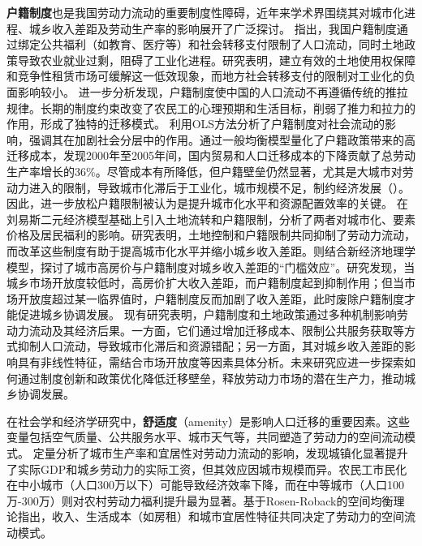 \documentclass[a4paper, zihao=-4, fontset = mac, oneside]{ctexbook} %
\begin{document}
\textbf{户籍制度}也是我国劳动力流动的重要制度性障碍，近年来学术界围绕其对城市化进程、城乡收入差距及劳动生产率的影响展开了广泛探讨。
\textcite{ngaiChinasMobilityBarriers2019}指出，我国户籍制度通过绑定公共福利（如教育、医疗等）和社会转移支付限制了人口流动，同时土地政策导致农业就业过剩，阻碍了工业化进程。研究表明，建立有效的土地使用权保障和竞争性租赁市场可缓解这一低效现象，而地方社会转移支付的限制对工业化的负面影响较小。
\textcite{LiQiangYingXiangZhongGuoChengXiangLiuDongRenKouDeTuiLiYuLaLiYinSuFenXi2003}进一步分析发现，户籍制度使中国的人口流动不再遵循传统的推拉规律。长期的制度约束改变了农民工的心理预期和生活目标，削弱了推力和拉力的作用，形成了独特的迁移模式。
\textcite{LuYiLongHuKouHuanQiZuoYongMaHuJiZhiDuYuSheHuiFenCengHeLiuDong2008}利用OLS方法分析了户籍制度对社会流动的影响，强调其在加剧社会分层中的作用。\textcite{tombeTradeMigrationProductivity2019}通过一般均衡模型量化了户籍政策带来的高迁移成本，发现2000年至2005年间，国内贸易和人口迁移成本的下降贡献了总劳动生产率增长的36\%。尽管成本有所降低，但户籍壁垒仍然显著，尤其是大城市对劳动力进入的限制，导致城市化滞后于工业化，城市规模不足，制约经济发展（\textcite{WangLiLiWoGuoRenKouQianYiChengBenChengShiGuiMoYuShengChanLu2020}）。因此，进一步放松户籍限制被认为是提升城市化水平和资源配置效率的关键。
\textcite{ZhouWenTuDiLiuZhuanHuJiZhiDuGaiGeYuZhongGuoChengShiHuaLiLunYuMoNi2017}在刘易斯二元经济模型基础上引入土地流转和户籍限制，分析了两者对城市化、要素价格及居民福利的影响。研究表明，土地控制和户籍限制共同抑制了劳动力流动，而改革这些制度有助于提高城市化水平并缩小城乡收入差距。\textcite{AnHuSenChengShiGaoFangJieHeHuJiZhiDuCuJinHuoYiZhiChengXiangShouRuChaiJuKuoDaZhongGuoLaoDongLiLiuDongHeShouRuChaiJuKuoDaBeiLunDeYiGeJieShi2011}则结合新经济地理学模型，探讨了城市高房价与户籍制度对城乡收入差距的“门槛效应”。研究发现，当城乡市场开放度较低时，高房价扩大收入差距，而户籍制度起到抑制作用；但当市场开放度超过某一临界值时，户籍制度反而加剧了收入差距，此时废除户籍制度才能促进城乡协调发展。
现有研究表明，户籍制度和土地政策通过多种机制影响劳动力流动及其经济后果。一方面，它们通过增加迁移成本、限制公共服务获取等方式抑制人口流动，导致城市化滞后和资源错配；另一方面，其对城乡收入差距的影响具有非线性特征，需结合市场开放度等因素具体分析。未来研究应进一步探索如何通过制度创新和政策优化降低迁移壁垒，释放劳动力市场的潜在生产力，推动城乡协调发展。


在社会学和经济学研究中，\textbf{舒适度}（amenity）是影响人口迁移的重要因素。这些变量包括空气质量、公共服务水平、城市天气等，共同塑造了劳动力的空间流动模式。
\textcite{YangXiChengShiGuiMoYuChengZhenHuaNongMinGongShiMinHuaDeJingJiXiaoYingJiYuChengShiShengChanLuYuYiJuDuChaiYiDeDingLiangFenXi2017}定量分析了城市生产率和宜居性对劳动力流动的影响，发现城镇化显著提升了实际GDP和城乡劳动力的实际工资，但其效应因城市规模而异。农民工市民化在中小城市（人口300万以下）可能导致经济效率下降，而在中等城市（人口100万-300万）则对农村劳动力福利提升最为显著。\textcite{WangLiNuoJiYuYaLiMenJianJiaShuoDeJiaTingQianJuYiXiangXingChengJiZhiYanJiuYiHangZhouShiQuWeiLi2007}基于Rosen-Roback的空间均衡理论指出，收入、生活成本（如房租）和城市宜居性特征共同决定了劳动力的空间流动模式。
\end{document}
